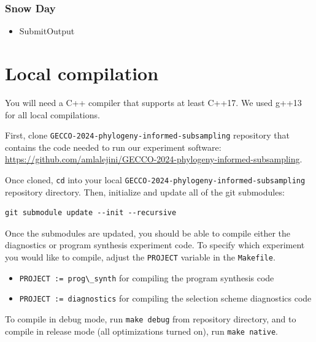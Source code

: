 \documentclass[
]{book}
\newcommand{\passthrough}[1]{#1}
\providecommand{\tightlist}{%
  \setlength{\itemsep}{0pt}\setlength{\parskip}{0pt}}
\begin{document}
\hypertarget{snow-day}{%
\subsection{Snow Day}\label{snow-day}}

\begin{itemize}
\tightlist
\item
  SubmitOutput
\end{itemize}

\hypertarget{local-compilation}{%
\chapter{Local compilation}\label{local-compilation}}

You will need a C++ compiler that supports at least C++17.
We used g++13 for all local compilations.

First, clone \passthrough{\lstinline!GECCO-2024-phylogeny-informed-subsampling!} repository that contains the code needed to run our experiment software: \url{https://github.com/amlalejini/GECCO-2024-phylogeny-informed-subsampling}.

Once cloned, \passthrough{\lstinline!cd!} into your local \passthrough{\lstinline!GECCO-2024-phylogeny-informed-subsampling!} repository directory.
Then, initialize and update all of the git submodules:

\begin{lstlisting}
git submodule update --init --recursive
\end{lstlisting}

Once the submodules are updated, you should be able to compile either the diagnostics or program synthesis experiment code.
To specify which experiment you would like to compile, adjust the \passthrough{\lstinline!PROJECT!} variable in the \passthrough{\lstinline!Makefile!}.

\begin{itemize}
\tightlist
\item
  \passthrough{\lstinline!PROJECT := prog\_synth!} for compiling the program synthesis code
\item
  \passthrough{\lstinline!PROJECT := diagnostics!} for compiling the selection scheme diagnostics code
\end{itemize}

To compile in debug mode, run \passthrough{\lstinline!make debug!} from repository directory, and to compile in release mode (all optimizations turned on), run \passthrough{\lstinline!make native!}.
\end{document}
